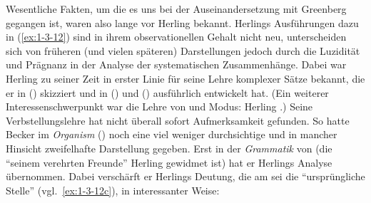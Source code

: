 \documentclass[output=paper]{langsci/langscibook}
\begin{document}
Wesentliche Fakten, um die es uns bei der Auseinandersetzung mit Greenberg
gegangen ist, waren also lange vor Herling bekannt. Herlings Ausführungen dazu in
(\ref{ex:1-3-12}) sind in ihrem observationellen Gehalt nicht neu, unterscheiden sich von früheren (und vielen späteren) Darstellungen jedoch durch die Luzidität und Prägnanz in
der Analyse der systematischen Zusammenhänge. Dabei war Herling zu seiner Zeit
in erster Linie für seine Lehre komplexer Sätze bekannt, die er in (\citeyear{Herling1821T})
skizziert und in (\citeyear{Herling1823, Herling1827, Herling1832}) und (\citeyear{Herling1828})
ausführlich entwickelt hat. (Ein weiterer Interessenschwerpunkt war die Lehre von  und Modus:
Herling \citeyearpar{Herling1821C,Herling1837,Herling1840}.)
Seine Verbstellungslehre hat nicht überall sofort Aufmerksamkeit gefunden. So hatte
Becker im \textit{Organism} (\citeyear[319f]{Becker1827}) noch eine viel weniger durchsichtige und in mancher Hinsicht zweifelhafte Darstellung gegeben. Erst in der \textit{Grammatik} von \citeyear{Becker1829} (die "`seinem verehrten Freunde"' Herling gewidmet ist) hat er Herlings Analyse übernommen. Dabei verschärft er Herlings Deutung, die  am 
sei die "`ursprüngliche Stelle"' (vgl.\ \ref{ex:1-3-12c}), in interessanter Weise:
\end{document}
